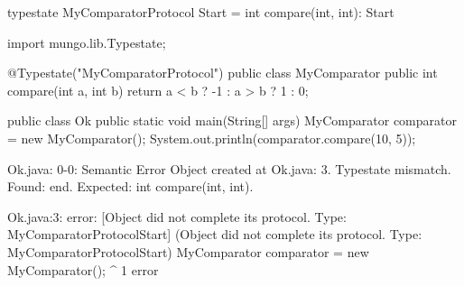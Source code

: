 \begin{code}
typestate MyComparatorProtocol {
  Start = {
    int compare(int, int): Start
  }
}\end{code}

\begin{code}
import mungo.lib.Typestate;

@Typestate("MyComparatorProtocol")
public class MyComparator {
  public int compare(int a, int b) {
    return a < b ? -1 : a > b ? 1 : 0;
  }
}\end{code}

\begin{code}
public class Ok {
	public static void main(String[] args) {
		MyComparator comparator = new MyComparator();
    System.out.println(comparator.compare(10, 5));
	}
}\end{code}

\lstset{caption=Original Mungo output}
\begin{code}

Ok.java: 0-0: Semantic Error
		Object created at Ok.java: 3. Typestate mismatch. Found: end. Expected: int compare(int, int).
\end{code}

\lstset{caption=New Mungo output}
\begin{code}
Ok.java:3: error: [Object did not complete its protocol. Type: MyComparatorProtocol{Start}] (Object did not complete its protocol. Type: MyComparatorProtocol{Start})
		MyComparator comparator = new MyComparator();
		             ^
1 error
\end{code}

